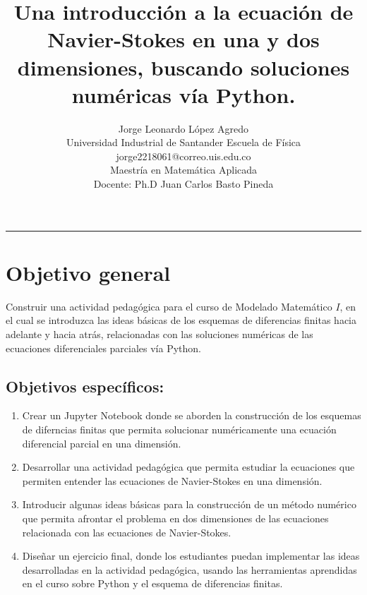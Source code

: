 \documentclass[A4,10pt]{article}
\title{{\huge \textbf{Una introducción a la ecuación de Navier-Stokes en una y dos dimensiones, buscando soluciones numéricas vía Python.}}}
\author{Jorge Leonardo López Agredo\\ 
	\small Universidad Industrial de Santander Escuela de Física\\
	 \small jorge2218061@correo.uis.edu.co\\ 
	\small Maestría en Matemática Aplicada\\
	 Docente: Ph.D Juan Carlos Basto Pineda\\ 
	\date{}
 }
\begin{document}
	\maketitle
	\vspace*{-1.5cm}
\begin{center}\rule{0.9\textwidth}{0.1mm} \end{center}

\section{Objetivo general}

Construir una actividad pedagógica para el curso de Modelado Matemático $I$, en el cual se introduzca las ideas básicas  de  los esquemas de diferencias finitas hacia adelante y hacia atrás, relacionadas con las soluciones numéricas de las ecuaciones diferenciales parciales vía Python.
\subsection{Objetivos específicos:}
\begin{enumerate}
	\item Crear un Jupyter Notebook donde se aborden la construcción de los esquemas de diferncias finitas que permita solucionar numéricamente una ecuación diferencial parcial en una dimensión.
	
	\item Desarrollar una actividad pedagógica que permita estudiar la ecuaciones que permiten entender las ecuaciones de Navier-Stokes en una dimensión.
	
	\item Introducir algunas ideas básicas para la construcción de un método numérico que permita afrontar el problema en dos dimensiones de las ecuaciones relacionada con las ecuaciones de Navier-Stokes.
	
	\item  Diseñar un ejercicio final, donde los estudiantes puedan implementar las ideas desarrolladas en la actividad pedagógica, usando las herramientas aprendidas en el curso sobre Python y el esquema de diferencias finitas.

	
\end{enumerate}
\end{document}
